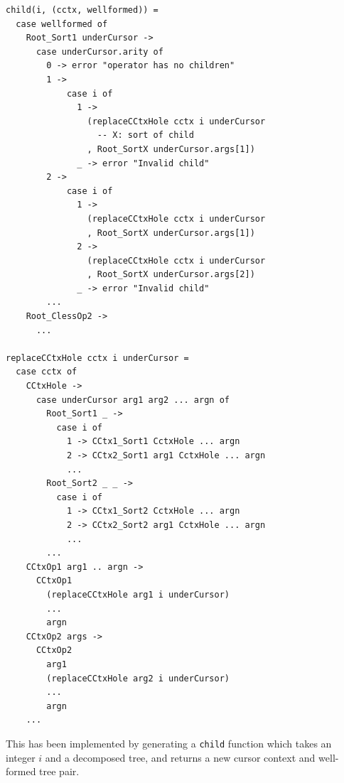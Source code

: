 \begin{lstlisting}[style=inline,caption={Pseudocode for applying child operator},label={lst:cursor-movement-pseudocode}]
child(i, (cctx, wellformed)) =
  case wellformed of
    Root_Sort1 underCursor ->
      case underCursor.arity of
        0 -> error "operator has no children"
        1 -> 
            case i of
              1 -> 
                (replaceCCtxHole cctx i underCursor
                  -- X: sort of child
                , Root_SortX underCursor.args[1])
              _ -> error "Invalid child"
        2 ->
            case i of
              1 -> 
                (replaceCCtxHole cctx i underCursor
                , Root_SortX underCursor.args[1])
              2 -> 
                (replaceCCtxHole cctx i underCursor
                , Root_SortX underCursor.args[2])
              _ -> error "Invalid child"
        ...
    Root_ClessOp2 ->
      ...

replaceCCtxHole cctx i underCursor =
  case cctx of
    CCtxHole ->
      case underCursor arg1 arg2 ... argn of
        Root_Sort1 _ -> 
          case i of
            1 -> CCtx1_Sort1 CctxHole ... argn
            2 -> CCtx2_Sort1 arg1 CctxHole ... argn
            ...  
        Root_Sort2 _ _ ->
          case i of
            1 -> CCtx1_Sort2 CctxHole ... argn
            2 -> CCtx2_Sort2 arg1 CctxHole ... argn
            ...
        ...
    CCtxOp1 arg1 .. argn ->
      CCtxOp1 
        (replaceCCtxHole arg1 i underCursor) 
        ... 
        argn
    CCtxOp2 args ->
      CCtxOp2 
        arg1 
        (replaceCCtxHole arg2 i underCursor) 
        ... 
        argn
    ...
\end{lstlisting}

This has been implemented by generating a \texttt{child} function which
takes an integer $i$ and a decomposed tree, and returns a new cursor context
and well-formed tree pair.


